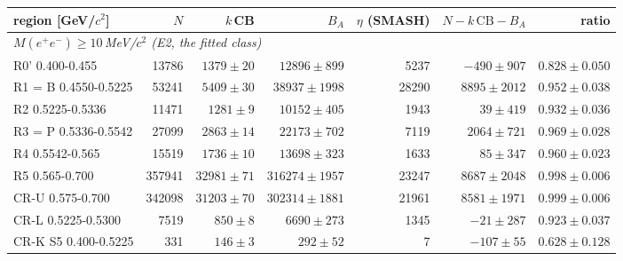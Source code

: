 \begin{tabular}{lrrrrrr}
\toprule
region [GeV/$c^2$] & $N$ & $k\,$CB & $B_A$ & $\eta$ (SMASH) & $N - k\,\mathrm{CB} - B_A$ & ratio \\
\midrule
\multicolumn{7}{l}{\emph{$M(e^+e^-)\geq10$\,MeV/$c^2$ (E2, the fitted class)}} \\
R0' 0.400-0.455 & 13786 & $1379 \pm 20$ & $12896 \pm 899$ & 5237 & $-490 \pm 907$ & $0.828 \pm 0.050$ \\
R1 = B 0.4550-0.5225 & 53241 & $5409 \pm 30$ & $38937 \pm 1998$ & 28290 & $8895 \pm 2012$ & $0.952 \pm 0.038$ \\
R2 0.5225-0.5336 & 11471 & $1281 \pm 9$ & $10152 \pm 405$ & 1943 & $39 \pm 419$ & $0.932 \pm 0.036$ \\
R3 = P 0.5336-0.5542 & 27099 & $2863 \pm 14$ & $22173 \pm 702$ & 7119 & $2064 \pm 721$ & $0.969 \pm 0.028$ \\
R4 0.5542-0.565 & 15519 & $1736 \pm 10$ & $13698 \pm 323$ & 1633 & $85 \pm 347$ & $0.960 \pm 0.023$ \\
R5 0.565-0.700 & 357941 & $32981 \pm 71$ & $316274 \pm 1957$ & 23247 & $8687 \pm 2048$ & $0.998 \pm 0.006$ \\
CR-U 0.575-0.700 & 342098 & $31203 \pm 70$ & $302314 \pm 1881$ & 21961 & $8581 \pm 1971$ & $0.999 \pm 0.006$ \\
CR-L 0.5225-0.5300 & 7519 & $850 \pm 8$ & $6690 \pm 273$ & 1345 & $-21 \pm 287$ & $0.923 \pm 0.037$ \\
CR-K S5 0.400-0.5225 & 331 & $146 \pm 3$ & $292 \pm 52$ & 7 & $-107 \pm 55$ & $0.628 \pm 0.128$ \\
\bottomrule
\end{tabular}
